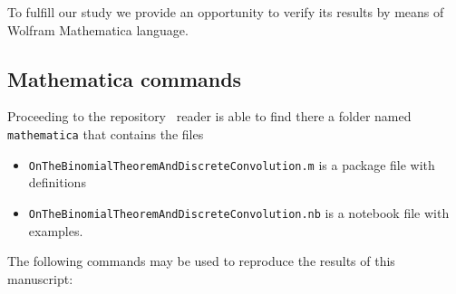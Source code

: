 To fulfill our study we provide an opportunity to verify its results by means of Wolfram Mathematica language.

\subsection{Mathematica commands} \label{subsec:mathematica-commands}
Proceeding to the repository~\cite{github_source_files} reader is able to find there a folder named \texttt{mathematica}
that contains the files
\begin{itemize}
    \item \texttt{OnTheBinomialTheoremAndDiscreteConvolution.m} is a package file with definitions
    \item \texttt{OnTheBinomialTheoremAndDiscreteConvolution.nb} is a notebook file with examples.
\end{itemize}
The following commands may be used to reproduce the results of this manuscript:
